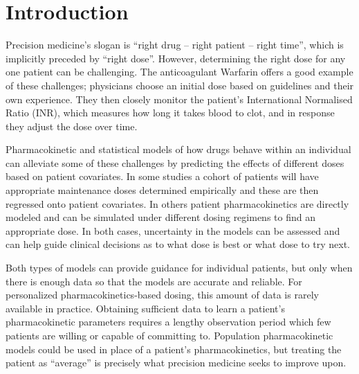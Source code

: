 \section{Introduction}

Precision medicine’s slogan is ``right drug -- right patient -- right time'', which is implicitly preceded by ``right dose''. However, determining the right dose for any one patient can be challenging. The anticoagulant Warfarin offers a good example of these challenges; physicians choose an initial dose based on guidelines and their own experience. They then closely monitor the patient’s International Normalised Ratio (INR), which measures how long it takes blood to clot, and in response they adjust the dose over time.

Pharmacokinetic and statistical models of how drugs behave within an individual can alleviate some of these challenges by predicting the effects of different doses based on patient covariates. In some studies \citep{schwarz2008genetic,Sohrabi2017-zv, Caldwell2007-mi}  a cohort of patients will have appropriate maintenance doses determined empirically and these are then regressed onto patient covariates.  In others \citep{ohara2019differences,Zhu2017-rk, Xue2017-mp}  patient pharmacokinetics are directly modeled and can be simulated under different dosing regimens to find an appropriate dose.  In both cases, uncertainty in the models can be assessed and can help guide clinical decisions as to what dose is best or what dose to try next.

Both types of  models can provide guidance for individual patients, but only when there is enough data so that the models are accurate and reliable. For personalized pharmacokinetics-based dosing, this amount of data is rarely available in practice.  Obtaining sufficient data to learn a patient’s pharmacokinetic parameters requires a lengthy observation period which few patients are willing or capable of committing to. Population pharmacokinetic models could be used in place of a patient’s pharmacokinetics, but treating the patient as “average” is precisely what precision medicine seeks to improve upon.


